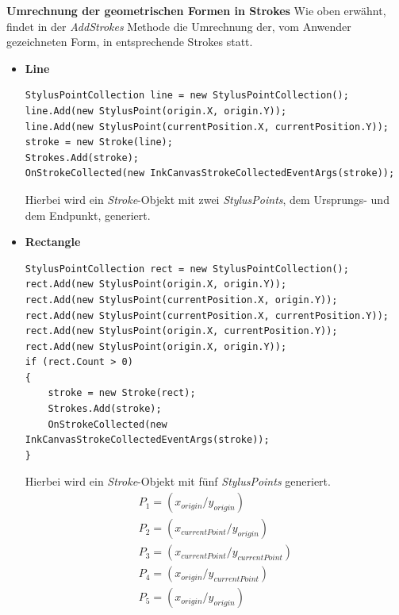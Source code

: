 \textbf{Umrechnung der geometrischen Formen in Strokes}
Wie oben erwähnt, findet in der \textit{AddStrokes} Methode die Umrechnung der, vom Anwender gezeichneten Form, in entsprechende Strokes statt. 
\begin{itemize}
\item \textbf{Line}\\ 
\begin{lstlisting}[language = CSharp, captionpos=b, caption={Linie in Strokes konvertieren}]
StylusPointCollection line = new StylusPointCollection();
line.Add(new StylusPoint(origin.X, origin.Y));
line.Add(new StylusPoint(currentPosition.X, currentPosition.Y));
stroke = new Stroke(line);
Strokes.Add(stroke);
OnStrokeCollected(new InkCanvasStrokeCollectedEventArgs(stroke));
\end{lstlisting}
Hierbei wird ein \textit{Stroke}-Objekt mit zwei \textit{StylusPoints}, dem Ursprungs- und dem Endpunkt, generiert.
\item \textbf{Rectangle}\\ 
\begin{lstlisting}[language = CSharp, captionpos=b, caption={Rechteck in Strokes konvertieren}]
StylusPointCollection rect = new StylusPointCollection();
rect.Add(new StylusPoint(origin.X, origin.Y));
rect.Add(new StylusPoint(currentPosition.X, origin.Y));
rect.Add(new StylusPoint(currentPosition.X, currentPosition.Y));
rect.Add(new StylusPoint(origin.X, currentPosition.Y));
rect.Add(new StylusPoint(origin.X, origin.Y));
if (rect.Count > 0)
{
	stroke = new Stroke(rect);
	Strokes.Add(stroke);
	OnStrokeCollected(new InkCanvasStrokeCollectedEventArgs(stroke));
}
\end{lstlisting}
Hierbei wird ein \textit{Stroke}-Objekt mit fünf \textit{StylusPoints} generiert. 
\begin{align}
P_1 = (x_{origin} / y_{origin})\\
P_2 = (x_{currentPoint} / y_{origin})\\
P_3 = (x_{currentPoint} / y_{currentPoint})\\
P_4 = (x_{origin} / y_{currentPoint})\\
P_5 = (x_{origin} / y_{origin})
\end{align}


\end{itemize}
